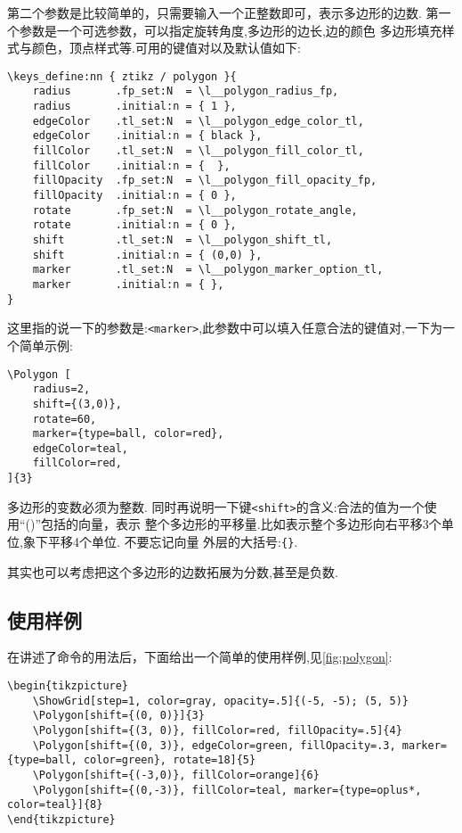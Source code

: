 \documentclass[
  hyper,    
  lang=cn,
  class=book,
  bib_index={load},
  mathSpec={envStyle=leftbar, alias},
  toc={column=2, title=目录},
]{zlatex}
\let\cmd\ztexverb
\newcommand{\zkey}[1]{\texttt{<#1>}}
\begin{document}
第二个参数是比较简单的，只需要输入一个正整数即可，表示多边形的边数. 第一个参数是一个可选参数，可以指定旋转角度,多边形的边长,边的颜色
多边形填充样式与颜色，顶点样式等.可用的键值对以及默认值如下:

\begin{verbatim}
\keys_define:nn { ztikz / polygon }{
    radius       .fp_set:N  = \l__polygon_radius_fp,
    radius       .initial:n = { 1 },
    edgeColor    .tl_set:N  = \l__polygon_edge_color_tl,
    edgeColor    .initial:n = { black },
    fillColor    .tl_set:N  = \l__polygon_fill_color_tl,
    fillColor    .initial:n = {  },
    fillOpacity  .fp_set:N  = \l__polygon_fill_opacity_fp,
    fillOpacity  .initial:n = { 0 },
    rotate       .fp_set:N  = \l__polygon_rotate_angle,
    rotate       .initial:n = { 0 },
    shift        .tl_set:N  = \l__polygon_shift_tl,
    shift        .initial:n = { (0,0) },
    marker       .tl_set:N  = \l__polygon_marker_option_tl,
    marker       .initial:n = { },
}
\end{verbatim}

这里指的说一下的参数是:\zkey{marker},此参数中可以填入任意合法的\cmd{<marker option>}键值对,一下为一个简单示例:
\begin{verbatim}
\Polygon [
    radius=2, 
    shift={(3,0)}, 
    rotate=60, 
    marker={type=ball, color=red}, 
    edgeColor=teal, 
    fillColor=red, 
]{3}
\end{verbatim}

\begin{remark}
  多边形的变数必须为整数. 同时再说明一下键\zkey{shift}的含义:合法的值为一个使用``()''包括的向量，表示 
  整个多边形的平移量.比如\cmd{shift={(3,-4)}}表示整个多边形向右平移3个单位,象下平移4个单位. 不要忘记向量
  外层的大括号:\texttt{\{\}}. 
\end{remark}

\begin{remark}
  其实也可以考虑把这个多边形的边数拓展为分数,甚至是负数.
\end{remark}

\subsection{使用样例}
在讲述了\cmd{\Polygon}命令的用法后，下面给出一个简单的使用样例,见\cref{fig:polygon}:
\begin{verbatim}
\begin{tikzpicture}
    \ShowGrid[step=1, color=gray, opacity=.5]{(-5, -5); (5, 5)}
    \Polygon[shift={(0, 0)}]{3}
    \Polygon[shift={(3, 0)}, fillColor=red, fillOpacity=.5]{4}
    \Polygon[shift={(0, 3)}, edgeColor=green, fillOpacity=.3, marker={type=ball, color=green}, rotate=18]{5}
    \Polygon[shift={(-3,0)}, fillColor=orange]{6}
    \Polygon[shift={(0,-3)}, fillColor=teal, marker={type=oplus*, color=teal}]{8}
\end{tikzpicture}
\end{verbatim}
\end{document}
